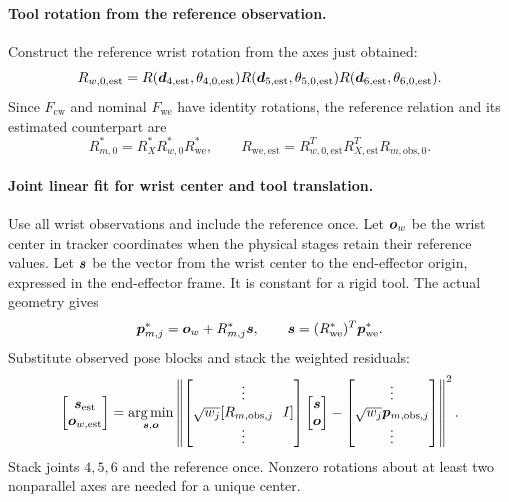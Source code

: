 \documentclass[../main.tex]{subfiles}
\begin{document}
\paragraph{Tool rotation from the reference observation.}
Construct the reference wrist rotation from the axes just obtained:
\begin{equation*}
R_{w,0,\mathrm{est}}=
R(\bm{d}_{4,\mathrm{est}},\theta_{4,0,\mathrm{est}})
R(\bm{d}_{5,\mathrm{est}},\theta_{5,0,\mathrm{est}})
R(\bm{d}_{6,\mathrm{est}},\theta_{6,0,\mathrm{est}}).
\end{equation*}
Since $F_{\mathrm{cw}}$ and nominal $F_{\mathrm{we}}$ have identity rotations, the reference relation and its estimated counterpart are
\begin{equation*}
R_{m,0}^*=R_X^*R_{w,0}^*R_{\mathrm{we}}^*,\qquad
R_{\mathrm{we},\mathrm{est}}=R_{w,0,\mathrm{est}}^TR_{X,\mathrm{est}}^TR_{m,\mathrm{obs},0}.
\end{equation*}

\paragraph{Joint linear fit for wrist center and tool translation.}
Use all wrist observations and include the reference once. Let $\bm{o}_w$ be the wrist center in tracker coordinates when the physical stages retain their reference values. Let $\bm{s}$ be the vector from the wrist center to the end-effector origin, expressed in the end-effector frame. It is constant for a rigid tool. The actual geometry gives
\begin{equation*}
\bm{p}_{m,j}^*=\bm{o}_w+R_{m,j}^*\bm{s},\qquad
\bm{s}=(R_{\mathrm{we}}^*)^T\bm{p}_{\mathrm{we}}^*.
\end{equation*}
Substitute observed pose blocks and stack the weighted residuals:
\begin{equation}\label{eq:pivot}
\begin{bmatrix}\vct{s}_{\mathrm{est}}\\\vct{o}_{w,\mathrm{est}}\end{bmatrix}
=\underset{\vct{s},\vct{o}}{\arg\min}
\left\|
\begin{bmatrix}\vdots\\\sqrt{w_j}[R_{m,\mathrm{obs},j}\ \ I]\\\vdots\end{bmatrix}
\begin{bmatrix}\vct{s}\\\vct{o}\end{bmatrix}
-\begin{bmatrix}\vdots\\\sqrt{w_j}\vct{p}_{m,\mathrm{obs},j}\\\vdots\end{bmatrix}
\right\|^2.
\end{equation}
Stack joints $4,5,6$ and the reference once. Nonzero rotations about at least two nonparallel axes are needed for a unique center.
\end{document}

